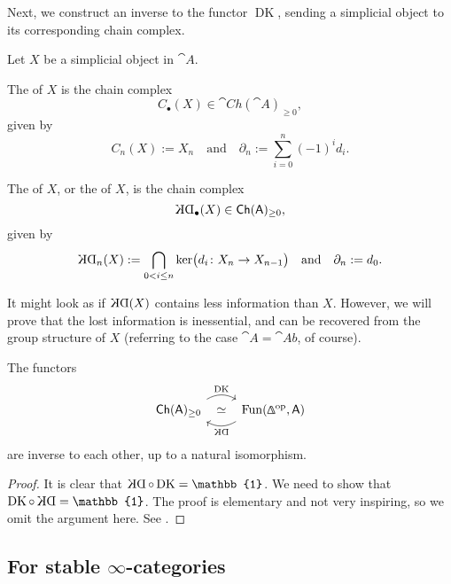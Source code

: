 Next, we construct an inverse to the functor $\operatorname{DK}$,
sending a simplicial object to its corresponding chain complex.

\begin{definition}
    Let $X$ be a simplicial object in $\cat{A}$.
    
    \begin{itms}
        \item
        The  of $X$ is the chain complex 
        \[C_\bullet(X)\in\cat{Ch}(\cat{A})_{\geq0},\]
        given by 
        \[C_n(X):=X_n\quad\text{and}\quad\partial_n:=\sum_{i=0}^n(-1)^id_i.\]

        \item 
        The  of $X$, or the
         of $X$, is the chain complex 
        \[\KD_\bullet(X)\in\cat{Ch}(\cat{A})_{\geq0},\]
        given by 
        \[\KD_n(X):=\bigcap_{0<i\leq n}\ker\bigl(d_i\:X_n\to X_{n-1}\bigr)
        \quad\text{and}\quad\partial_n:=d_0.\]
    \end{itms}
\end{definition}

It might look as if $\KD(X)$ contains less information than $X$.
However, we will prove that the lost information is inessential,
and can be recovered from the group structure of $X$
(referring to the case $\cat{A}=\cat{Ab}$, of course).

\begin{theorem}
    The functors
    \[\begin{tikzcd}
        \cat{Ch}(\cat{A})_{\geq0}
        \ar[r,bend left,start anchor=north east,end anchor=north west,"\operatorname{DK}"] 
        \ar[r,phantom,"\simeq"] &
        \operatorname{Fun}(\bfDelta\op,\cat{A})
        \ar[l,bend left,start anchor=south west,end anchor=south east,"\KD"]
    \end{tikzcd}\]
    are inverse to each other,
    up to a natural isomorphism.
\end{theorem}

\begin{proof}
    It is clear that $\KD\circ\operatorname{DK}=\mathbb{1}$.
    We need to show that $\operatorname{DK}\circ\KD=\mathbb{1}$.
    The proof is elementary and not very inspiring,
    so we omit the argument here.
    See \cite[Lemma~1.2.3.13]{ha}.
\end{proof}

\subsection{For stable \texorpdfstring{$\infty$}{∞}-categories}

